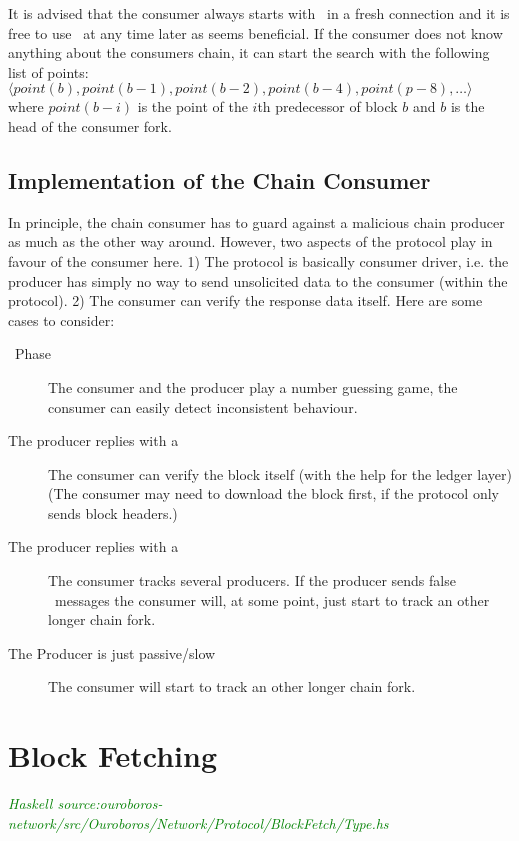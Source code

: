 \documentclass{report}
\newcommand{\hsref}[1]{{\textcolor{green}{\emph{Haskell source:#1}}}}
\newcommand{\wip}[1]{\color{magenta}{#1}\color{black}}
\newcommand{\state}[1]{\texttt{#1}}
\newcommand{\msg}[1]{\texttt{#1}}
\newcommand{\Idle}{\state{Idle}}
\newcommand{\Busy}{\state{Busy}}
\newcommand{\Done}{\state{Done}}
\theoremstyle{definition}{
  \newtheorem{lemma}{Lemma}[section] %
  \newtheorem{definition}[lemma]{Definition}
}
\theoremstyle{theorem}{
  \newtheorem{invariant}[lemma]{Invariant}
  \newtheorem{proofobligation}[lemma]{Proof Obligation}
}
\numberwithin{equation}{lemma}
\begin{document}
It is advised that the consumer always starts with \FindIntersect~in a fresh connection
and it is free to use \FindIntersect~at any time later as seems beneficial.
If the consumer does not know anything about the consumers chain,
it can start the search with the following list of points:
$\langle point(b), point(b-1), point(b-2), point(b-4), point (p-8),\ldots \rangle$
where $point(b-i)$ is the point of the $i$th predecessor of block $b$ and
$b$ is the head of the consumer fork.
\wip{(Note, that the maximum depth of a fork in Ouroboros is bounded).}

\subsection{Implementation of the Chain Consumer}
In principle, the chain consumer has to guard against a malicious chain producer
as much as the other way around.
However, two aspects of the protocol play in favour of the consumer here.
1) The protocol is basically consumer driver, i.e. the producer has simply no way to send unsolicited
data to the consumer (within the protocol).
2) The consumer can verify the response data itself.
Here are some cases to consider:
\begin{description}
\item[\FindIntersect~Phase] The consumer and the producer play a number guessing game, the consumer can easily detect inconsistent behaviour.
\item[The producer replies with a \RollForward] The consumer can verify the block itself
  (with the help for the ledger layer)
  (The consumer may need to download the block first, if the protocol only sends block headers.)
\item[The producer replies with a \RollBackward] The consumer tracks several producers.
  If the producer sends false \RollBackward~messages the consumer
  will, at some point, just start to track an other longer chain fork.
\item[The Producer is just passive/slow] The consumer will start to track an other longer chain fork.
\end{description}
\wip{This should be explained in detail}

\section{Block Fetching}
\label{block-fetching-protocol}

\hsref{ouroboros-network/src/Ouroboros/Network/Protocol/BlockFetch/Type.hs}
\renewcommand{\Idle}{\state{Idle}}
\renewcommand{\Busy}{\state{Busy}}
\newcommand{\Streaming}{\state{Streaming}}
\renewcommand{\Done}{\state{Done}}
\newcommand{\RequestRange}{\msg{RequestRange}}
\newcommand{\StartBatch}{\msg{StartBatch}}
\newcommand{\NoBlocks}{\msg{NoBlocks}}
\newcommand{\Block}{\msg{Block}}
\newcommand{\BatchDone}{\msg{BatchDone}}
\newcommand{\ClientDone}{\msg{ClientDone}}
\end{document}
